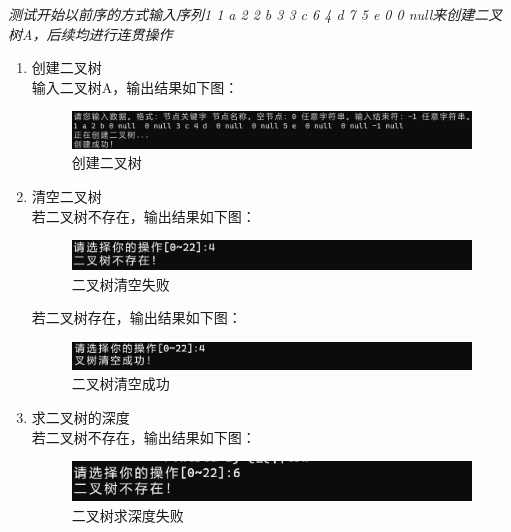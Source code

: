 \documentclass[supercite]{Experimental_Report}
\theoremstyle{definition}
\begin{document}
\emph{测试开始以前序的方式输入序列1 1 a  2 2 b   3 3 c  6 4 d  7 5 e  0 0 null来创建二叉树A，后续均进行连贯操作}
\begin{enumerate}
	\item 创建二叉树\\
	输入二叉树A，输出结果如下图：
\begin{figure}[H]
	\centering
	\includegraphics[width=1\linewidth]{images/创建二叉树.png}
	\caption{创建二叉树}
	\label{fig2-8}
\end{figure}
	\item 清空二叉树\\
	若二叉树不存在，输出结果如下图：
	\begin{figure}[H]
		\centering
		\includegraphics[width=1\linewidth]{images/二叉树清空失败.png}
		\caption{二叉树清空失败}
		\label{fig2-9}
	\end{figure}

	若二叉树存在，输出结果如下图：
	\begin{figure}[H]
		\centering
		\includegraphics[width=1\linewidth]{images/二叉树清空成功.png}
		\caption{二叉树清空成功}
		\label{fig2-10}
	\end{figure}
	\item 求二叉树的深度\\
	若二叉树不存在，输出结果如下图：
	\begin{figure}[H]
		\centering
		\includegraphics[width=1\linewidth]{images/求深度失败.png}
		\caption{二叉树求深度失败}
		\label{fig2-11}
	\end{figure}


\end{enumerate}
\end{document}
